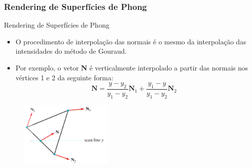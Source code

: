 \documentclass{beamer}
\begin{document}
\begin{frame}
\frametitle{Rendering de Superfícies de Phong}

		\begin{block}{Rendering de Superfícies de Phong}
		\begin{itemize}
			\item O procedimento de interpolação das normais é o mesmo da interpolação das intensidades do método de Gouraud.
			\item Por exemplo, o vetor \textbf{N} é verticalmente interpolado a partir das normais nos vértices 1 e 2 da seguinte forma:
			\begin{equation*}
				\textbf{N} = \frac{y-y_2}{y_1-y_2}\textbf{N}_1+\frac{y_1-y}{y_1-y_2}\textbf{N}_2
			\end{equation*}
		\end{itemize}
	\end{block}
	
		\begin{figure}[!h]
			\begin{center}
			\includegraphics[width=0.4\textwidth]{Figures/IntPho}
			\end{center}
		\end{figure}
\end{frame}



\end{document}
